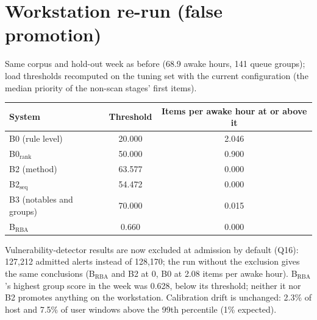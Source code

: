\documentclass[10.5pt,a4paper]{article}
\begin{document}
\section{Workstation re-run (false promotion)}
Same corpus and hold-out week as before (68.9 awake hours, 141 queue groups); load thresholds recomputed on the tuning set with the current configuration (the median priority of the non-scan stages' first items).
\begin{center}\small
\begin{tabular}{@{}l c c@{}}
\toprule
System & Threshold & Items per awake hour at or above it \\
\midrule
B0 (rule level) & 20.000 & 2.046 \\
B0$_\mathrm{rank}$ & 50.000 & 0.900 \\
B2 (method) & 63.577 & 0.000 \\
B2$_\mathrm{seq}$ & 54.472 & 0.000 \\
B3 (notables and groups) & 70.000 & 0.015 \\
B$_\mathrm{RBA}$ & 0.660 & 0.000 \\
\bottomrule
\end{tabular}
\end{center}
Vulnerability-detector results are now excluded at admission by default (Q16): 127{,}212 admitted alerts instead of 128{,}170; the run without the exclusion gives the same conclusions (B$_\mathrm{RBA}$ and B2 at 0, B0 at 2.08 items per awake hour). B$_\mathrm{RBA}$'s highest group score in the week was 0.628, below its threshold; neither it nor B2 promotes anything on the workstation. Calibration drift is unchanged: 2.3\% of host and 7.5\% of user windows above the 99th percentile (1\% expected).
\end{document}
